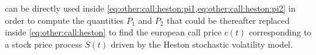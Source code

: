 \documentclass[12pt,a4paper]{report}
\begin{document}
 can be directly used inside \cref{eq:other:call:heston:pi1,eq:other:call:heston:pi2} in order to compute the quantities $P_1$ and $P_2$ that could be thereafter replaced inside \cref{eq:other:call:heston} to find the european call price  $c(t)$ corresponding to a stock price process $S(t)$ driven by the Heston stochastic volatility model.






























\begin{appendices}
\end{appendices}
\end{document}

